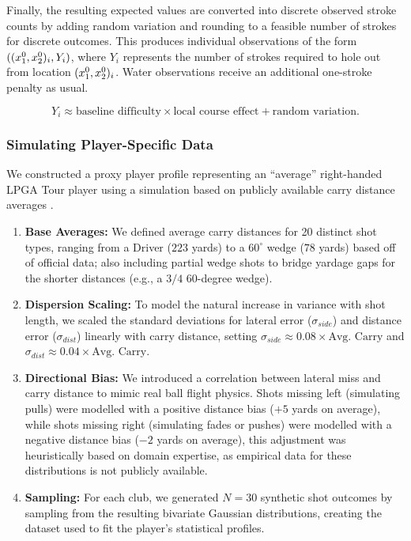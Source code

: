 \documentclass[11pt, letterpaper]{article}
\begin{document}
Finally, the resulting expected values are converted into discrete observed
stroke counts by adding random variation and rounding to a feasible number of
strokes for discrete outcomes. This produces individual observations of the form
$((x_1^0,x_2^0)_i,Y_i)$, where $Y_i$ represents the number of strokes required to
hole out from location $(x_1^0,x_2^0)_i$. Water observations receive an additional
one-stroke penalty as usual.

\[
Y_i \approx
\text{baseline difficulty} \times \text{local course effect}
+ \text{random variation}.
\]

\subsubsection{Simulating Player-Specific Data}
\label{app: player-data}
We constructed a proxy player profile representing an ``average'' right-handed LPGA Tour player using a simulation based on publicly available carry distance averages \parencite{trackman2024averages}.
\begin{enumerate}\item 
\textbf{Base Averages:} We defined average carry distances for 20 distinct shot types, ranging from a Driver ($223$ yards) to a $60^{\circ}$ wedge ($78$ yards) based off of official data; also including partial wedge shots to bridge yardage gaps for the shorter distances (e.g., a $3/4$ 60-degree wedge). 
\item \textbf{Dispersion Scaling:} To model the natural increase in variance with shot length, we scaled the standard deviations for lateral error ($\sigma_{side}$) and distance error ($\sigma_{dist}$) linearly with carry distance, setting $\sigma_{side} \approx 0.08 \times \text{Avg. Carry}$ and $\sigma_{dist} \approx 0.04 \times \text{Avg. Carry}$. 
\item \textbf{Directional Bias:} We introduced a correlation between lateral miss and carry distance to mimic real ball flight physics. Shots missing left (simulating pulls) were modelled with a positive distance bias ($+5$ yards on average), while shots missing right (simulating fades or pushes) were modelled with a negative distance bias ($-2$ yards on average), this adjustment was heuristically based on domain expertise, as empirical data for these distributions is not publicly available.

\item \textbf{Sampling:} For each club, we generated $N=30$ synthetic shot outcomes by sampling from the resulting bivariate Gaussian distributions, creating the dataset used to fit the player's statistical profiles.
\end{enumerate}
\end{document}
